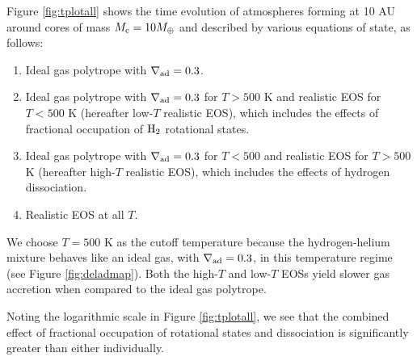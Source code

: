 \documentclass[apj]{emulateapj}
\newcommand{\delad}{\nabla_{\rm ad}}
\newcommand{\co}{_{\rm c}}
\begin{document}
Figure \ref{fig:tplotall} shows the time evolution of atmospheres forming at 10 AU around cores of mass $M\co=10 M_{\oplus}$ and described by various equations of state, as follows:
\begin{enumerate}
\item Ideal gas polytrope with $\delad=0.3$.
\item Ideal gas polytrope with $\delad=0.3$ for $T>500$ K and realistic EOS for $T<500$ K (hereafter low-$T$ realistic EOS), which includes the effects of fractional occupation of $\rm H_2$ rotational states.
\item Ideal gas polytrope with $\delad=0.3$ for $T<500$ and realistic EOS for $T>500$ K  (hereafter high-$T$ realistic EOS), which includes the effects of hydrogen dissociation.
\item Realistic EOS at all $T$. 
\end{enumerate}
We choose $T=500$ K as the cutoff temperature because the hydrogen-helium mixture behaves like an ideal gas, with $\delad=0.3$, in this temperature regime (see Figure \ref{fig:deladmap}). 
Both the high-$T$ and low-$T$ EOSs yield slower gas accretion when compared to the ideal gas polytrope.

Noting the logarithmic scale in Figure \ref{fig:tplotall}, we see that the combined effect of fractional occupation of rotational states and dissociation is significantly greater than either individually. %
  
\end{document}
